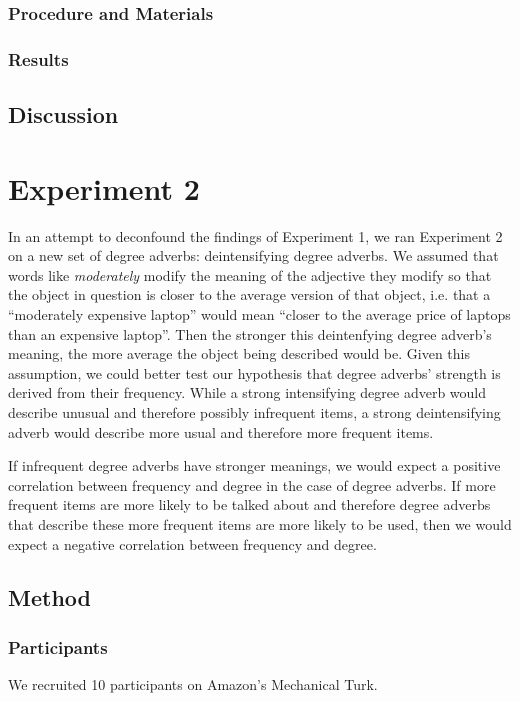 \documentclass[10pt,letterpaper]{article}
\begin{document}
    \subsubsection{Procedure and Materials}
  \subsubsection{Results}
  \subsection{Discussion}

\section{Experiment 2}

  In an attempt to deconfound the findings of Experiment 1, we ran Experiment 2 on a new set of degree adverbs: deintensifying degree adverbs. We assumed that words like \emph{moderately} modify the meaning of the adjective they modify so that the object in question is closer to the average version of that object, i.e. that a ``moderately expensive laptop'' would mean ``closer to the average price of laptops than an expensive laptop''. Then the stronger this deintenfying degree adverb's meaning, the more average the object being described would be. Given this assumption, we could better test our hypothesis that degree adverbs' strength is derived from their frequency. While a strong intensifying degree adverb would describe unusual and therefore possibly infrequent items, a strong deintensifying adverb would describe more usual and therefore more frequent items.
  
  If infrequent degree adverbs have stronger meanings, we would expect a positive correlation between frequency and degree in the case of degree adverbs. If more frequent items are more likely to be talked about and therefore degree adverbs that describe these more frequent items are more likely to be used, then we would expect a negative correlation between frequency and degree.
  
  
  \subsection{Method}
    \subsubsection{Participants}
    We recruited 10 participants on Amazon's Mechanical Turk.
\end{document}
